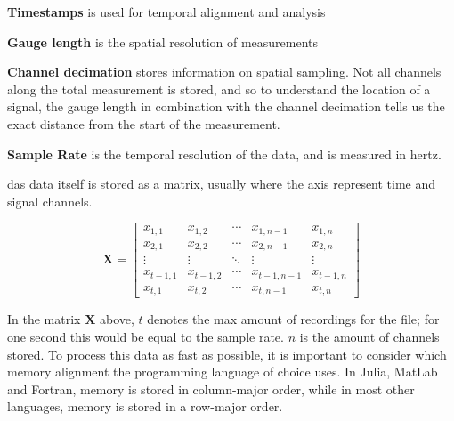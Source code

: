 \textbf{Timestamps} is used for temporal alignment and analysis

\textbf{Gauge length} is the spatial resolution of measurements

\textbf{Channel decimation} stores information on spatial sampling. Not all channels along the total measurement is stored, and so to understand the location of a signal, the gauge length in combination with the channel decimation tells us the exact distance from the start of the measurement.

\textbf{Sample Rate} is the temporal resolution of the data, and is measured in hertz.

\acrshort{das} data itself is stored as a matrix, usually where the axis represent time and signal channels.

\begin{table}[!h]
\centering
\begin{equation*}
\mathbf{X} = \begin{bmatrix}
x_{1,1} & x_{1,2} & \cdots & x_{1,n-1} & x_{1,n} \\
x_{2,1} & x_{2,2} & \cdots & x_{2,n-1} & x_{2,n} \\
\vdots & \vdots & \ddots & \vdots & \vdots \\
x_{t-1,1} & x_{t-1,2} & \cdots & x_{t-1,n-1} & x_{t-1,n} \\
x_{t,1} & x_{t,2} & \cdots & x_{t,n-1} & x_{t,n}
\end{bmatrix}
\end{equation*}
\label{fig:dasmatrix}
\end{table}

In the matrix $\textbf{X}$ above, $t$ denotes the max amount of recordings for the file; for one second this would be equal to the sample rate. $n$ is the amount of channels stored. To process this data as fast as possible, it is important to consider which memory alignment the programming language of choice uses. In Julia, MatLab and Fortran, memory is stored in column-major order, while in most other languages, memory is stored in a row-major order. 